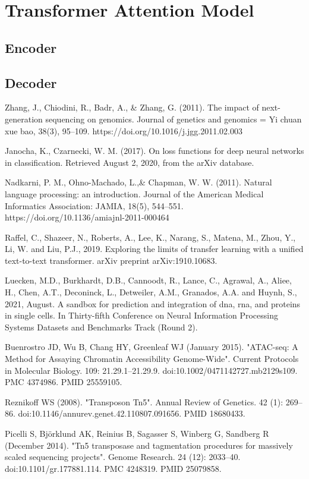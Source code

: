 \section{Transformer Attention Model}

\subsection{Encoder}

\subsection{Decoder}

\begin{thebibliography}{25}

 Zhang, J., Chiodini, R., Badr, A., \& Zhang, G. (2011). The impact of next-generation sequencing on genomics. Journal of genetics and genomics = Yi chuan xue bao, 38(3), 95–109. https://doi.org/10.1016/j.jgg.2011.02.003

 Janocha, K., Czarnecki, W. M. (2017). On loss functions for deep neural networks in classification. Retrieved August 2, 2020, from the arXiv database.

 Nadkarni, P. M., Ohno-Machado, L.,\& Chapman, W. W. (2011). Natural language processing: an introduction. Journal of the American Medical Informatics Association: JAMIA, 18(5), 544–551. https://doi.org/10.1136/amiajnl-2011-000464

 Raffel, C., Shazeer, N., Roberts, A., Lee, K., Narang, S., Matena, M., Zhou, Y., Li, W. and Liu, P.J., 2019. Exploring the limits of transfer learning with a unified text-to-text transformer. arXiv preprint arXiv:1910.10683.

 Luecken, M.D., Burkhardt, D.B., Cannoodt, R., Lance, C., Agrawal, A., Aliee, H., Chen, A.T., Deconinck, L., Detweiler, A.M., Granados, A.A. and Huynh, S., 2021, August. A sandbox for prediction and integration of dna, rna, and proteins in single cells. In Thirty-fifth Conference on Neural Information Processing Systems Datasets and Benchmarks Track (Round 2).

 Buenrostro JD, Wu B, Chang HY, Greenleaf WJ (January 2015). "ATAC-seq: A Method for Assaying Chromatin Accessibility Genome-Wide". Current Protocols in Molecular Biology. 109: 21.29.1–21.29.9. doi:10.1002/0471142727.mb2129s109. PMC 4374986. PMID 25559105.

 Reznikoff WS (2008). "Transposon Tn5". Annual Review of Genetics. 42 (1): 269–86. doi:10.1146/annurev.genet.42.110807.091656. PMID 18680433.

 Picelli S, Björklund AK, Reinius B, Sagasser S, Winberg G, Sandberg R (December 2014). "Tn5 transposase and tagmentation procedures for massively scaled sequencing projects". Genome Research. 24 (12): 2033–40. doi:10.1101/gr.177881.114. PMC 4248319. PMID 25079858.

\end{thebibliography}
